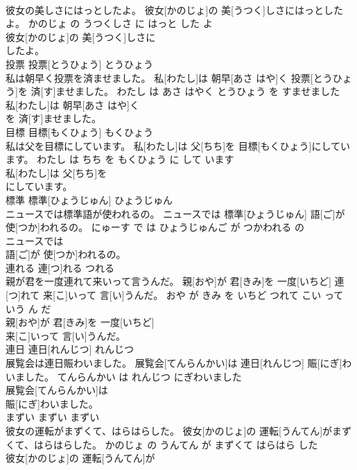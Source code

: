 \documentclass[8pt]{extreport}
\begin{document}
\begin{CJK}{UTF8}{min}
\\	彼女の美しさにはっとしたよ。	彼女[かのじょ]の 美[うつく]しさにはっとしたよ。	かのじょ の うつくしさ に はっと した よ	
\\	彼女[かのじょ]の 美[うつく]しさに
\\	したよ。			
\\	投票	投票[とうひょう]	とうひょう	
\\	私は朝早く投票を済ませました。	私[わたし]は 朝早[あさ はや]く 投票[とうひょう]を 済[す]ませました。	わたし は あさ はやく とうひょう を すませました	
\\	私[わたし]は 朝早[あさ はや]く
\\	を 済[す]ませました。			
\\	目標	目標[もくひょう]	もくひょう	
\\	私は父を目標にしています。	私[わたし]は 父[ちち]を 目標[もくひょう]にしています。	わたし は ちち を もくひょう に して います	
\\	私[わたし]は 父[ちち]を
\\	にしています。			
\\	標準	標準[ひょうじゅん]	ひょうじゅん	
\\	ニュースでは標準語が使われるの。	ニュースでは 標準[ひょうじゅん] 語[ご]が 使[つか]われるの。	にゅーす で は ひょうじゅんご が つかわれる の	
\\	ニュースでは
\\	語[ご]が 使[つか]われるの。			
\\	連れる	連[つ]れる	つれる	
\\	親が君を一度連れて来いって言うんだ。	親[おや]が 君[きみ]を 一度[いちど] 連[つ]れて 来[こ]いって 言[い]うんだ。	おや が きみ を いちど つれて こい って いう ん だ	
\\	親[おや]が 君[きみ]を 一度[いちど]
\\	来[こ]いって 言[い]うんだ。			
\\	連日	連日[れんじつ]	れんじつ	
\\	展覧会は連日賑わいました。	展覧会[てんらんかい]は 連日[れんじつ] 賑[にぎ]わいました。	てんらんかい は れんじつ にぎわいました	
\\	展覧会[てんらんかい]は
\\	賑[にぎ]わいました。			
\\	まずい	まずい	まずい	
\\	彼女の運転がまずくて、はらはらした。	彼女[かのじょ]の 運転[うんてん]がまずくて、はらはらした。	かのじょ の うんてん が まずくて はらはら した	
\\	彼女[かのじょ]の 運転[うんてん]が

\end{CJK}
\end{document}
